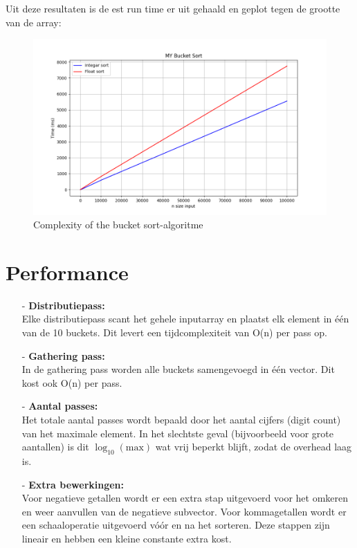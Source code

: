 \documentclass{article}
\begin{document}
Uit deze resultaten is de est run time er uit gehaald en geplot tegen de grootte van de array:
\begin{figure}[H]
    \includegraphics[width=1\textwidth]{images/bucket_sort.png}
    \caption{Complexity of the bucket sort-algoritme}
    \label{fig:complexity}
\end{figure}

\section{Performance}
\begin{itemize}
\item[-] \textbf{Distributiepass:} \\
Elke distributiepass scant het gehele inputarray en plaatst elk element in één van de 10 buckets. Dit levert een tijdcomplexiteit van O(n) per pass op.

\item[-] \textbf{Gathering pass:} \\
In de gathering pass worden alle buckets samengevoegd in één vector. Dit kost ook O(n) per pass.

\item[-] \textbf{Aantal passes:} \\
Het totale aantal passes wordt bepaald door het aantal cijfers (digit count) van het maximale element. In het slechtste geval (bijvoorbeeld voor grote aantallen) is dit $\log_{10}(\mathrm{max})$ wat vrij beperkt blijft, zodat de overhead laag is.

\item[-] \textbf{Extra bewerkingen:} \\
Voor negatieve getallen wordt er een extra stap uitgevoerd voor het omkeren en weer aanvullen van de negatieve subvector.
Voor kommagetallen wordt er een schaaloperatie uitgevoerd vóór en na het sorteren. Deze stappen zijn lineair en hebben een kleine constante extra kost.
\end{itemize}
\end{document}
